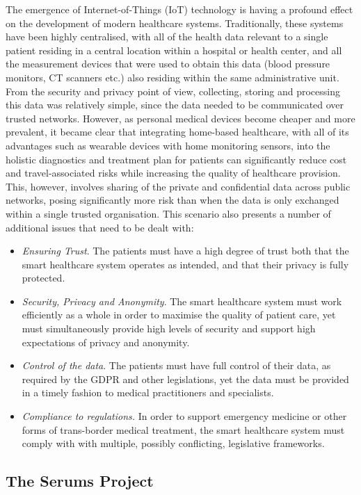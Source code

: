 \noindent
The emergence of Internet-of-Things (IoT) technology is having a profound effect on the development of modern healthcare systems. Traditionally, these systems have been highly centralised, with all of the health data relevant to a single patient residing in a central location within a hospital or health center, and all the measurement devices that were used to obtain this data (blood pressure monitors, CT scanners etc.) also residing within the same administrative unit. From the security and privacy point of view, collecting, storing and processing this data was relatively simple, since the data needed to be communicated over trusted networks. However, as personal medical devices become cheaper and more prevalent, it became clear that integrating home-based healthcare, with all of its advantages such as wearable devices with home monitoring sensors, into the holistic diagnostics and treatment plan for patients can significantly reduce cost and travel-associated risks while increasing the quality of healthcare provision. This, however, involves sharing of the private and confidential data across public networks, posing significantly more risk than when the data is only exchanged within a single trusted organisation. This scenario also presents a number of additional issues that need to be dealt with:
\begin{itemize}
    \item \emph{Ensuring Trust}. The patients must have a high degree of trust both that the smart healthcare system operates as intended, and that their privacy is fully protected.
    \item \emph{Security, Privacy and Anonymity}. The smart healthcare system must work efficiently as a whole in order to maximise the quality of patient care, yet must simultaneously provide high levels of security and support high expectations of privacy and anonymity.
    \item \emph{Control of the data}. The patients must have full control of their data, as required by the GDPR and other legislations, yet the data must be provided in a timely fashion to medical practitioners and specialists.
    \item \emph{Compliance to regulations.} In order to support emergency medicine or other forms of trans-border medical treatment, the smart healthcare system must comply with with multiple, possibly conflicting, legislative frameworks.
\end{itemize}

\subsection{The Serums Project}

